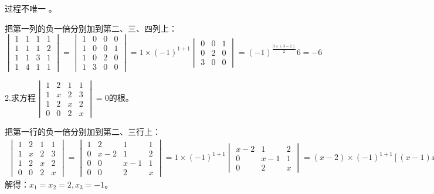 \documentclass{article}
\begin{document}
\begin{jie}
过程不唯一 。

把第一列的负一倍分别加到第二、三、四列上：
\begin{equation*}
\begin{vmatrix}
  1 & 1 & 1 & 1 \\
  1 & 1 & 1& 2 \\
  1 & 1 & 3& 1\\
   1 & 4 &1 &1
\end{vmatrix}=\begin{vmatrix}
  1 & 0 & 0 & 0 \\
  1 & 0 & 0& 1 \\
  1 & 0 & 2& 0\\
   1 & 3 &0 &0
\end{vmatrix}=1\times(-1)^{1+1}\begin{vmatrix}
 0 & 0& 1 \\
 0 & 2& 0\\
 3 &0 &0
\end{vmatrix}=(-1)^{\frac{3\times(3-1)}{2}}6=-6
\end{equation*}
\end{jie}

2.求方程$
\begin{vmatrix}
  1 & 2 & 1 & 1 \\
  1 & x & 2& 3 \\
  1 & 2 & x& 2\\
   0 & 0 &2 &x
\end{vmatrix}=0
$的根。

\begin{jie}
把第一行的负一倍分别加到第二、三行上：
\begin{align*}
\begin{vmatrix}
  1 & 2 & 1 & 1 \\
  1 & x & 2& 3 \\
  1 & 2 & x& 2\\
   0 & 0 &2 &x
\end{vmatrix}=\begin{vmatrix}
  1 & 2 & 1 & 1 \\
  0 & x-2 & 1& 2 \\
  0 & 0 & x-1& 1\\
   0 & 0 &2 &x
\end{vmatrix}=1\times(-1)^{1+1}\begin{vmatrix}
  x-2 & 1& 2 \\
   0 & x-1& 1\\
   0 &2 &x
\end{vmatrix}=(x-2)\times(-1)^{1+1}[(x-1)x-2\times1]=0
\end{align*}
解得：$x_{1}=x_{2}=2,x_{3}=-1$。
\end{jie}
\end{document}
